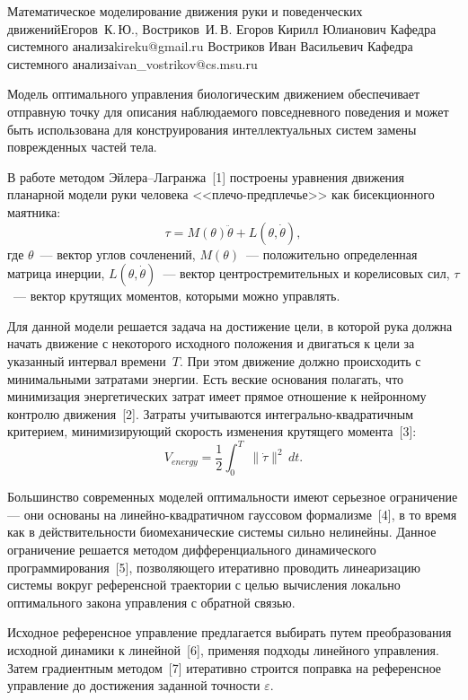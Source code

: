 \begin{lmrarticle}%
    {Математическое моделирование движения руки и поведенческих движений}{Егоров~К.\,Ю., Востриков~И.\,В.}
    \TwoAuthor%
    {Егоров Кирилл Юлианович}%
        {Кафедра системного анализа}{kireku@gmail.ru}%
    {Востриков Иван Васильевич}%
        {Кафедра системного анализа}{ivan\_vostrikov@cs.msu.ru}
    
    Модель оптимального управления биологическим движением обеспечивает отправную точку для описания наблюдаемого повседневного поведения и может быть использована для конструирования интеллектуальных систем замены поврежденных частей тела.
    
    В работе методом Эйлера--Лагранжа~[1] построены уравнения движения планарной модели руки человека <<плечо-предплечье>> как бисекционного маятника:
    \begin{equation*}
        \tau = M(\theta)\ddot\theta + L(\theta, \dot\theta),
    \end{equation*}
    где $\theta$~--- вектор углов сочленений, $M(\theta)$~--- положительно определенная матрица инерции, $L(\theta, \dot\theta)$~--- вектор центростремительных и корелисовых сил, $\tau$~--- вектор крутящих моментов, которыми можно управлять.

    Для данной модели решается задача на достижение цели, в которой рука должна начать движение с некоторого исходного положения и двигаться к цели за указанный интервал времени~$T$.
    При этом движение должно происходить с минимальными затратами энергии.
    Есть веские основания полагать, что минимизация энергетических затрат имеет прямое отношение к нейронному контролю движения~[2].
    Затраты учитываются интегрально-квадратичным критерием, минимизирующий скорость изменения крутящего момента~[3]:
    \begin{equation*}
        V_{energy} = \mbox{$\frac{1}{2}\int_{0}^{T}$}\;\|\dot \tau\|^2\,dt.
    \end{equation*}

    Большинство современных моделей оптимальности имеют серьезное ограничение — они основаны на линейно-квадратичном гауссовом формализме~[4], в то время как в действительности биомеханические системы сильно нелинейны.
    Данное ограничение решается методом дифференциального динамического программирования~[5], позволяющего итеративно проводить линеаризацию системы вокруг референсной траектории с целью вычисления локально оптимального закона управления с обратной связью.

    Исходное референсное управление предлагается выбирать путем преобразования исходной динамики к линейной~[6], применяя подходы линейного управления.
    Затем градиентным методом~[7] итеративно строится поправка на референсное управление до достижения заданной точности $\varepsilon$. 
    

\end{lmrarticle}
